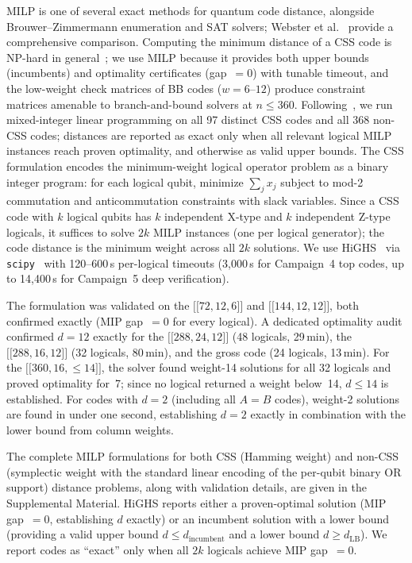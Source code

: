 \documentclass[aps,prxquantum,twocolumn,superscriptaddress,nofootinbib]{revtex4-2}
\newcommand{\dblbrk}[1]{\ensuremath{\lbrack\!\lbrack #1 \rbrack\!\rbrack}}
\newcommand{\code}[1]{\dblbrk{#1}}
\begin{document}
MILP is one of several exact methods for quantum code distance, alongside Brouwer--Zimmermann enumeration and SAT solvers; Webster et al.~\cite{webster2026distance} provide a comprehensive comparison.
Computing the minimum distance of a CSS code is NP-hard in general~\cite{kapshikar2022hardness}; we use MILP because it provides both upper bounds (incumbents) and optimality certificates (gap~$= 0$) with tunable timeout, and the low-weight check matrices of BB codes ($w = 6$--$12$) produce constraint matrices amenable to branch-and-bound solvers at $n \leq 360$.
Following~\cite{bravyi2024high}, we run mixed-integer linear programming on all 97 distinct CSS codes and all 368 non-CSS codes; distances are reported as exact only when all relevant logical MILP instances reach proven optimality, and otherwise as valid upper bounds.
The CSS formulation encodes the minimum-weight logical operator problem as a binary integer program: for each logical qubit, minimize $\sum_j x_j$ subject to mod-2 commutation and anticommutation constraints with slack variables.
Since a CSS code with $k$ logical qubits has $k$ independent X-type and $k$ independent Z-type logicals, it suffices to solve $2k$ MILP instances (one per logical generator); the code distance is the minimum weight across all $2k$ solutions.
We use HiGHS~\cite{huangfu2018highs} via \texttt{scipy}~\cite{virtanen2020scipy} with 120--600\,s per-logical timeouts (3{,}000\,s for Campaign~4 top codes, up to 14{,}400\,s for Campaign~5 deep verification).

The formulation was validated on the $\code{72,12,6}$ and $\code{144,12,12}$, both confirmed exactly (MIP gap~$= 0$ for every logical).
A dedicated optimality audit confirmed $d = 12$ exactly for the $\code{288,24,12}$ (48 logicals, 29\,min), the $\code{288,16,12}$ (32 logicals, 80\,min), and the gross code (24 logicals, 13\,min).
For the $\code{360,16,{\leq}14}$, the solver found weight-14 solutions for all 32 logicals and proved optimality for~7; since no logical returned a weight below~14, $d \leq 14$ is established.
For codes with $d = 2$ (including all $A = B$ codes), weight-2 solutions are found in under one second, establishing $d = 2$ exactly in combination with the lower bound from column weights.

The complete MILP formulations for both CSS (Hamming weight) and non-CSS (symplectic weight with the standard linear encoding of the per-qubit binary OR support) distance problems, along with validation details, are given in the Supplemental Material.
HiGHS reports either a proven-optimal solution (MIP gap~$= 0$, establishing $d$ exactly) or an incumbent solution with a lower bound (providing a valid upper bound $d \leq d_{\text{incumbent}}$ and a lower bound $d \geq d_{\text{LB}}$).
We report codes as ``exact'' only when all $2k$ logicals achieve MIP gap~$= 0$.
\end{document}
